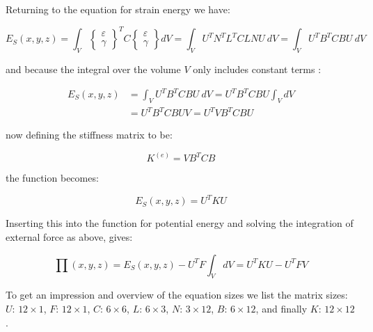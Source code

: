 Returning to the equation for strain energy we have:

\begin{equation}
E_S (x,y,z)
= \int_V
\begin{Bmatrix}
\varepsilon \\
\gamma
\end{Bmatrix}
^T C
\begin{Bmatrix}
\varepsilon \\
\gamma
\end{Bmatrix}
dV = \int_V U^T N^T L^T C L N U \ dV
= \int_V U^T B^T C B U \ dV
\end{equation}

and because the integral over the volume $V$ only includes constant
terms :

\begin{equation}
\begin{aligned}
E_S (x,y,z) 
&= \int_V U^T B^T C B U \ dV 
= U^T B^T C B U \int_V dV \\
&= U^T B^T C B U V 
= U^T V B^T C B U
\end{aligned}
\end{equation}

now defining the stiffness matrix to be:

\begin{equation}
K^{(e)} = V B^T C B
\end{equation}

the function becomes:

\begin{equation}
E_S (x,y,z) = U^T K U
\end{equation}

Inserting this into the function for potential energy and solving
the integration of external force as above, gives:

\begin{equation}
\label{eq:linear-sys-eq}
\prod (x,y,z) = E_S(x,y,z) - U^T F \int_V dV = U^T K U - U^T F V
\end{equation}

To get an impression and overview of the equation sizes we list the
matrix sizes: $U$: $12 \times 1$, $F$: $12 \times 1$, $C$: $6 \times
6$, $L$: $6 \times 3$, $N$: $3 \times 12$,
$B$: $6 \times 12$, and finally $K$: $12 \times 12$.


